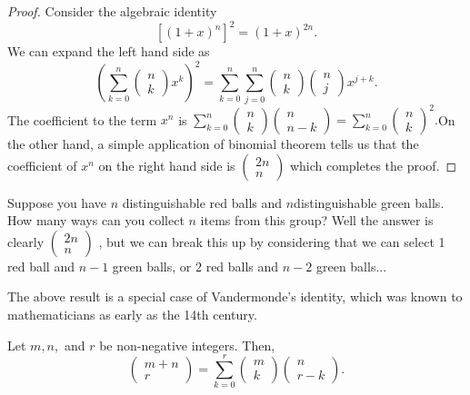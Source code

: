 \begin{proof}
Consider the algebraic identity
\[
\left[\left(1+x\right)^{n}\right]^{2}=\left(1+x\right)^{2n}.
\]
We can expand the left hand side as 
\[
\left(\sum_{k=0}^{n}\left(\begin{array}{c}
n\\
k
\end{array}\right)x^{k}\right)^{2}=\sum_{k=0}^{n}\sum_{j=0}^{n}\left(\begin{array}{c}
n\\
k
\end{array}\right)\left(\begin{array}{c}
n\\
j
\end{array}\right)x^{j+k}.
\]
The coefficient to the term $x^{n}$ is $\sum_{k=0}^{n}\left(\begin{array}{c}
n\\
k
\end{array}\right)\left(\begin{array}{c}
n\\
n-k
\end{array}\right)=\sum_{k=0}^{n}\left(\begin{array}{c}
n\\
k
\end{array}\right)^{2}.$On the other hand, a simple application of binomial theorem tells
us that the coefficient of $x^{n}$ on the right hand side is $\left(\begin{array}{c}
2n\\
n
\end{array}\right)$ which completes the proof.
\end{proof}
\begin{rem*}
Suppose you have $n$ distinguishable red balls and $n$distinguishable
green balls. How many ways can you collect $n$ items from this group?
Well the answer is clearly $\left(\begin{array}{c}
2n\\
n
\end{array}\right)$ , but we can break this up by considering that we can select 1 red
ball and $n-1$ green balls, or $2$ red balls and $n-2$ green balls...
\end{rem*}
The above result is a special case of Vandermonde's identity, which
was known to mathematicians as early as the 14th century.
\begin{prop}
\label{prop:vandermondeIdentity}Let $m,n,$ and $r$ be non-negative
integers. Then,
\[
\left(\begin{array}{c}
m+n\\
r
\end{array}\right)=\sum_{k=0}^{r}\left(\begin{array}{c}
m\\
k
\end{array}\right)\left(\begin{array}{c}
n\\
r-k
\end{array}\right).
\]
\end{prop}


